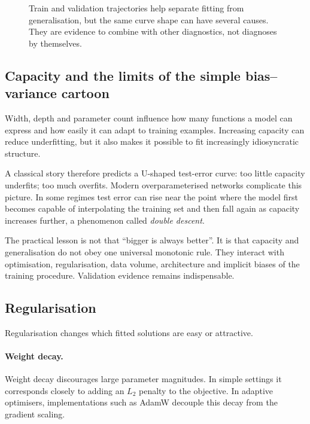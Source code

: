 \begin{figure}[ht]
  \caption{Train and validation trajectories help separate fitting from generalisation, but the same curve shape can have several causes. They are evidence to combine with other diagnostics, not diagnoses by themselves.}
  \label{fig:week4-generalisation-curves}
\end{figure}

\subsection{Capacity and the limits of the simple bias--variance cartoon}

Width, depth and parameter count influence how many functions a model can express and how easily it can adapt to training examples. Increasing capacity can reduce underfitting, but it also makes it possible to fit increasingly idiosyncratic structure.

A classical story therefore predicts a U-shaped test-error curve: too little capacity underfits; too much overfits. Modern overparameterised networks complicate this picture. In some regimes test error can rise near the point where the model first becomes capable of interpolating the training set and then fall again as capacity increases further, a phenomenon called \emph{double descent}.

The practical lesson is not that ``bigger is always better''. It is that capacity and generalisation do not obey one universal monotonic rule. They interact with optimisation, regularisation, data volume, architecture and implicit biases of the training procedure. Validation evidence remains indispensable.

\subsection{Regularisation}

Regularisation changes which fitted solutions are easy or attractive.

\paragraph{Weight decay.}
Weight decay discourages large parameter magnitudes. In simple settings it corresponds closely to adding an \(L_2\) penalty to the objective. In adaptive optimisers, implementations such as AdamW decouple this decay from the gradient scaling.

